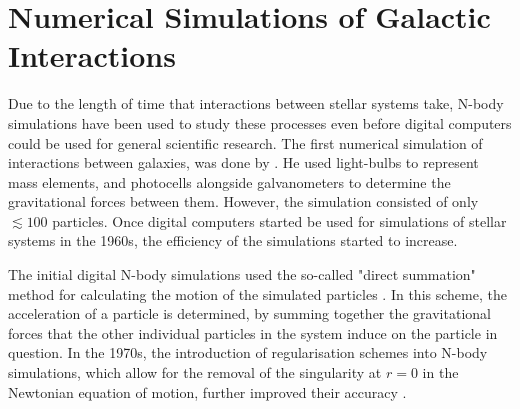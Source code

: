 \documentclass[english, twoside]{HYgradu}
\begin{document}


\section{Numerical Simulations of Galactic Interactions}

Due to the length of time that interactions between stellar systems take, N-body simulations have been used to study these processes even before digital computers could be used for general scientific research. The first numerical  simulation of interactions between galaxies, was done by \cite{Holmberg1941}. He used light-bulbs to represent mass elements, and photocells alongside galvanometers to determine the gravitational forces between them. However, the simulation consisted of only $\lesssim 100$ particles. Once digital computers started be used for simulations of stellar systems in the 1960s, the efficiency of the simulations started to increase. 

The initial digital N-body simulations used the so-called "direct summation" method for calculating the motion of the simulated particles \citep{vonHoerner1960, Aarseth1963}. In this scheme, the acceleration of a particle is determined, by summing together the gravitational forces that the other individual particles in the system induce on the particle in question. In the 1970s, the introduction of regularisation schemes into N-body simulations, which allow for the removal of the singularity at $r = 0$ in the Newtonian equation of motion, further improved their accuracy \citep{Aarseth1999}.
\end{document}
